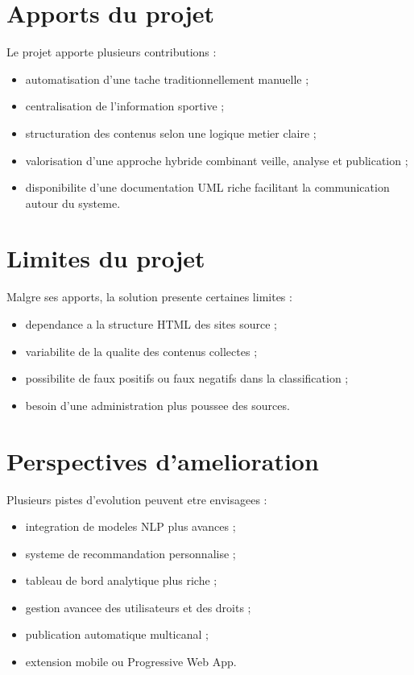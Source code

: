 \documentclass[12pt,a4paper,oneside]{report}
\begin{document}
\section{Apports du projet}
Le projet apporte plusieurs contributions :
\begin{itemize}
\item automatisation d'une tache traditionnellement manuelle ;
\item centralisation de l'information sportive ;
\item structuration des contenus selon une logique metier claire ;
\item valorisation d'une approche hybride combinant veille, analyse et publication ;
\item disponibilite d'une documentation UML riche facilitant la communication autour du systeme.
\end{itemize}

\section{Limites du projet}
Malgre ses apports, la solution presente certaines limites :
\begin{itemize}
\item dependance a la structure HTML des sites source ;
\item variabilite de la qualite des contenus collectes ;
\item possibilite de faux positifs ou faux negatifs dans la classification ;
\item besoin d'une administration plus poussee des sources.
\end{itemize}

\section{Perspectives d'amelioration}
Plusieurs pistes d'evolution peuvent etre envisagees :
\begin{itemize}
\item integration de modeles NLP plus avances ;
\item systeme de recommandation personnalise ;
\item tableau de bord analytique plus riche ;
\item gestion avancee des utilisateurs et des droits ;
\item publication automatique multicanal ;
\item extension mobile ou Progressive Web App.
\end{itemize}
\end{document}

